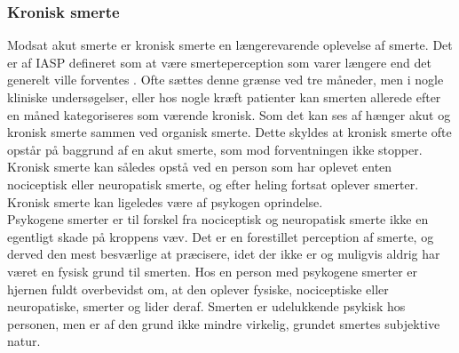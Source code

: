 \subsubsection{Kronisk smerte}
Modsat akut smerte er kronisk smerte en længerevarende oplevelse af smerte. Det er af IASP defineret som at være smerteperception som varer længere end det generelt ville forventes \citep{Carmon}. Ofte sættes denne grænse ved tre måneder, men i nogle kliniske undersøgelser, eller hos nogle kræft patienter kan smerten allerede efter en måned kategoriseres som værende kronisk. Som det kan ses af  hænger akut og kronisk smerte sammen ved organisk smerte. Dette skyldes at kronisk smerte ofte opstår på baggrund af en akut smerte, som mod forventningen ikke stopper. Kronisk smerte kan således opstå ved en person som har oplevet enten nociceptisk eller neuropatisk smerte, og efter heling fortsat oplever smerter. Kronisk smerte kan ligeledes være af psykogen oprindelse.\\
Psykogene smerter er til forskel fra nociceptisk og neuropatisk smerte ikke en egentligt skade på kroppens væv. Det er en forestillet perception af smerte, og derved den mest besværlige at præcisere, idet der ikke er og muligvis aldrig har været en fysisk grund til smerten. Hos en person med psykogene smerter er hjernen fuldt overbevidst om, at den oplever fysiske, nociceptiske eller neuropatiske, smerter og lider deraf. Smerten er udelukkende psykisk hos personen, men er af den grund ikke mindre virkelig, grundet smertes subjektive natur. \citep{Giangregorio1997}





